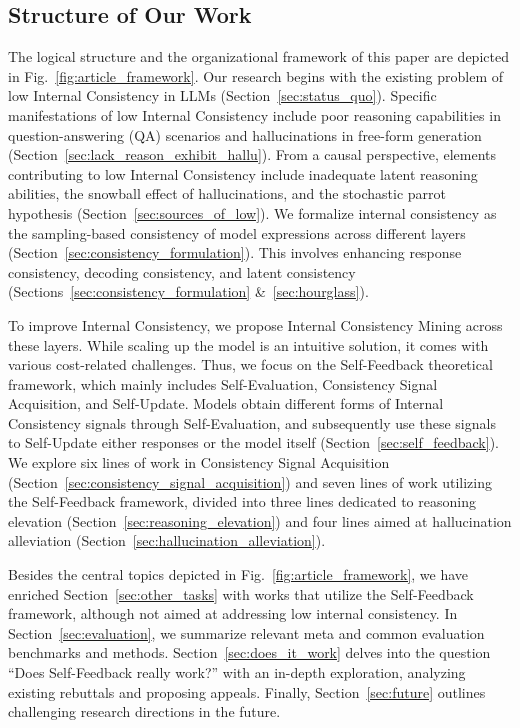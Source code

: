 \documentclass[lettersize,journal]{IEEEtran}
\begin{document}
\subsection{Structure of Our Work}


\noindent The logical structure and the organizational framework of this paper are depicted in Fig.~\ref{fig:article_framework}. Our research begins with the existing problem of low Internal Consistency in LLMs (Section~\ref{sec:status_quo}). Specific manifestations of low Internal Consistency include poor reasoning capabilities in question-answering (QA) scenarios and hallucinations in free-form generation (Section~\ref{sec:lack_reason_exhibit_hallu}). From a causal perspective, elements contributing to low Internal Consistency include inadequate latent reasoning abilities, the snowball effect of hallucinations, and the stochastic parrot hypothesis (Section~\ref{sec:sources_of_low}). We formalize internal consistency as the sampling-based consistency of model expressions across different layers (Section~\ref{sec:consistency_formulation}). This involves enhancing response consistency, decoding consistency, and latent consistency (Sections~\ref{sec:consistency_formulation} \&~\ref{sec:hourglass}).

To improve Internal Consistency, we propose Internal Consistency Mining across these layers. While scaling up the model is an intuitive solution, it comes with various cost-related challenges. Thus, we focus on the Self-Feedback theoretical framework, which mainly includes Self-Evaluation, Consistency Signal Acquisition, and Self-Update. Models obtain different forms of Internal Consistency signals through Self-Evaluation, and subsequently use these signals to Self-Update either responses or the model itself (Section~\ref{sec:self_feedback}). We explore six lines of work in Consistency Signal Acquisition (Section~\ref{sec:consistency_signal_acquisition}) and seven lines of work utilizing the Self-Feedback framework, divided into three lines dedicated to reasoning elevation (Section~\ref{sec:reasoning_elevation}) and four lines aimed at hallucination alleviation (Section~\ref{sec:hallucination_alleviation}).

Besides the central topics depicted in Fig.~\ref{fig:article_framework}, we have enriched Section~\ref{sec:other_tasks} with works that utilize the Self-Feedback framework, although not aimed at addressing low internal consistency. In Section~\ref{sec:evaluation}, we summarize relevant meta and common evaluation benchmarks and methods. Section~\ref{sec:does_it_work} delves into the question ``Does Self-Feedback really work?'' with an in-depth exploration, analyzing existing rebuttals and proposing appeals. Finally, Section~\ref{sec:future} outlines challenging research directions in the future.
\end{document}

